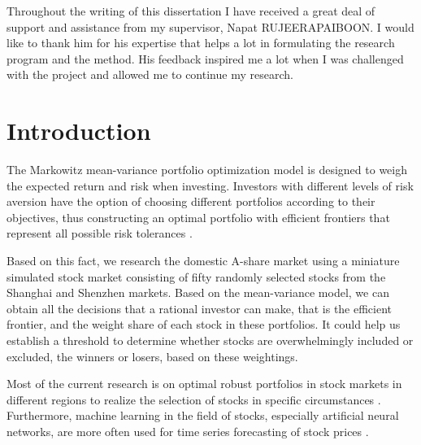 \documentclass[default,iicol]{sn-jnl}%
\begin{document}



\maketitle
\clearpage
\onecolumn
\tableofcontents  %
\clearpage
\twocolumn
{}

Throughout the writing of this dissertation I have received a great deal of support and assistance from my supervisor, Napat RUJEERAPAIBOON. I would like to thank him for his expertise that helps a lot in formulating the research program and the method. His feedback inspired me a lot when I was challenged with the project and allowed me to continue my research.

\section{Introduction}\label{sec1}


\hspace{1.5em}The Markowitz mean-variance portfolio optimization model \cite{1952Portfolio} is designed to weigh the expected return and risk when investing. Investors with different levels of risk aversion have the option of choosing different portfolios according to their objectives, thus constructing an optimal portfolio with efficient frontiers that represent all possible risk tolerances \cite{2009Investment}.

Based on this fact, we research the domestic A-share market using a miniature simulated stock market consisting of fifty randomly selected stocks from the Shanghai and Shenzhen markets. Based on the mean-variance model, we can obtain all the decisions that a rational investor can make, that is the efficient frontier, and the weight share of each stock in these portfolios. It could help us establish a threshold to determine whether stocks are overwhelmingly included or excluded, the winners or losers, based on these weightings.

Most of the current research is on optimal robust portfolios in stock markets in different regions to realize the selection of stocks in specific circumstances \cite{2019Application,lee2024comparison}. Furthermore, machine learning in the field of stocks, especially artificial neural networks, are more often used for time series forecasting of stock prices \cite{2016Application,2022Robust}.
\end{document}
